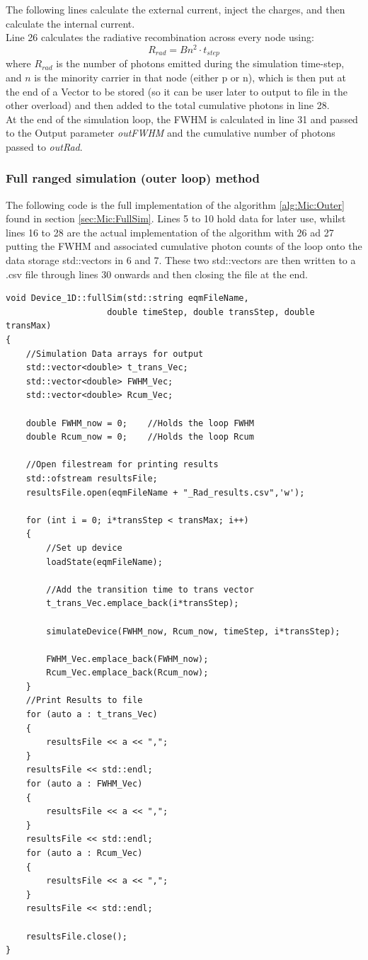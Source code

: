 \documentclass[titlepage]{article}
\begin{document}
The following lines calculate the external current, inject the charges, and then calculate the internal current. \\
Line 26 calculates the radiative recombination across every node using: 
\begin{equation}
	R_{rad} = Bn^2 \cdot t_{step}
\end{equation}
where $R_{rad}$ is the number of photons emitted during the simulation time-step, and $n$ is the minority carrier in that node (either p or n), which is then put at the end of a Vector to be stored (so it can be user later to output to file in the other overload) and then added to the total cumulative photons in line 28.\\
At the end of the simulation loop, the FWHM is calculated in line 31 and passed to the Output parameter \textit{outFWHM} and the cumulative number of photons passed to \textit{outRad}.\\

\subsubsection{Full ranged simulation (outer loop) method}
The following code is the full implementation of the algorithm \ref{alg:Mic:Outer} found in section \ref{sec:Mic:FullSim}. Lines 5 to 10 hold data for later use, whilst lines 16 to 28 are the actual implementation of the algorithm with 26 ad 27 putting the FWHM and associated cumulative photon counts of the loop onto the data storage std::vectors in 6 and 7. These two std::vectors are then written to a .csv file through lines 30 onwards and then closing the file at the end.
\begin{lstlisting}[caption = Full outer simulation loop method]
void Device_1D::fullSim(std::string eqmFileName, 
					double timeStep, double transStep, double transMax)
{
	//Simulation Data arrays for output
	std::vector<double> t_trans_Vec;
	std::vector<double> FWHM_Vec;
	std::vector<double> Rcum_Vec;
	
	double FWHM_now = 0;	//Holds the loop FWHM
	double Rcum_now = 0;	//Holds the loop Rcum
	
	//Open filestream for printing results
	std::ofstream resultsFile;
	resultsFile.open(eqmFileName + "_Rad_results.csv",'w');
	
	for (int i = 0; i*transStep < transMax; i++)
	{
		//Set up device
		loadState(eqmFileName);
		
		//Add the transition time to trans vector
		t_trans_Vec.emplace_back(i*transStep);
		
		simulateDevice(FWHM_now, Rcum_now, timeStep, i*transStep);
		
		FWHM_Vec.emplace_back(FWHM_now);
		Rcum_Vec.emplace_back(Rcum_now);
	}
	//Print Results to file
	for (auto a : t_trans_Vec)
	{
		resultsFile << a << ",";
	}
	resultsFile << std::endl;
	for (auto a : FWHM_Vec)
	{
		resultsFile << a << ",";
	}
	resultsFile << std::endl;
	for (auto a : Rcum_Vec)
	{
		resultsFile << a << ",";
	}
	resultsFile << std::endl;
	
	resultsFile.close();
}
\end{lstlisting}
\end{document}
